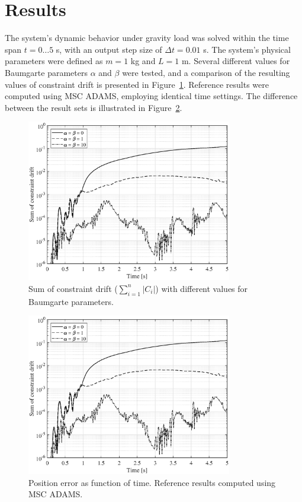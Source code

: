 \documentclass{article}
\begin{document}
\section*{Results}
The system's dynamic behavior under gravity load was solved within the time span $t = 0 \dots 5$ s, with an output step size of $\Delta t = 0.01$ s. The system's physical parameters were defined as $m = 1$ kg and $L = 1$ m. Several different values for Baumgarte parameters $\alpha$ and $\beta$ were tested, and a comparison of the resulting values of constraint drift is presented in Figure~\ref*{fig:constraintdrift}. Reference results were computed using MSC ADAMS, employing identical time settings. The difference between the result sets is illustrated in Figure~\ref*{fig:comparison}.

\begin{figure}[h!]
	\centering
	\includegraphics[width=0.8\textwidth]{constraintdrift.eps}
	\caption{Sum of constraint drift ($\sum_{i=1}^{n} |C_i| $) with different values for Baumgarte parameters.\label{fig:constraintdrift}}
\end{figure}

\begin{figure}[h!]
	\centering
	\includegraphics[width=0.8\textwidth]{constraintdrift.eps}
	\caption{Position error as function of time. Reference results computed using MSC ADAMS.\label{fig:comparison}}
\end{figure}
\end{document}
